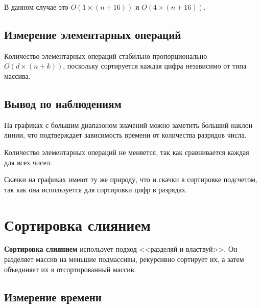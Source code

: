 \documentclass[11pt]{article}
\begin{document}
В данном случае это $O(1 \times (n + 16))$ и $O(4 \times (n + 16))$.

\subsection{Измерение элементарных операций}

\begin{center}
\end{center}
{ \hspace*{\fill} }

\begin{center}
\end{center}
{ \hspace*{\fill} }

Количество элементарных операций стабильно пропорционально $O(d \times (n + k))$,
поскольку сортируется каждая цифра независимо от типа массива.

\subsection{Вывод по наблюдениям}

На графиках с большим диапазоном значений можно заметить больший наклон линии, что подтверждает зависимость
времени от количества разрядов числа.

Количество элементарных операций не меняется, так как сравнивается каждая для всех чисел.

Скачки на графиках имеют ту же природу, что и скачки в сортировке подсчетом, так как она используется для сортировки
цифр в разрядах.

\newpage

\setcounter{section}{9}
\section*{\centering Сортировка слиянием}

\textbf{Сортировка слиянием} использует подход <<разделяй и властвуй>>. Он разделяет массив на меньшие подмассивы,
рекурсивно сортирует их, а затем объединяет их в отсортированный массив.

\setcounter{subsection}{0}
\subsection{Измерение времени}
\end{document}
